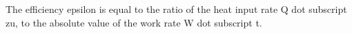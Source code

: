 The efficiency epsilon is equal to the ratio of the heat input rate Q dot subscript zu, to the absolute value of the work rate W dot subscript t.